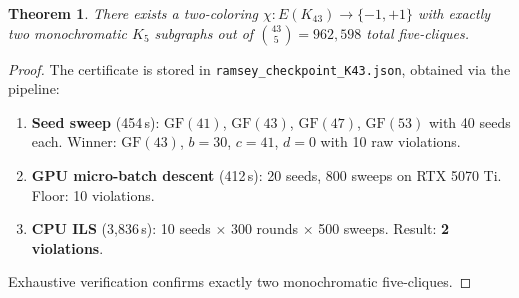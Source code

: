 \documentclass[11pt,a4paper]{article}
\theoremstyle{plain}
\newtheorem{theorem}{Theorem}[section]
\theoremstyle{remark}
\newcommand{\GF}{\mathrm{GF}}
\begin{document}
\begin{theorem}\label{thm:k43-frontier}
There exists a two-coloring $\chi: E(K_{43}) \to \{-1, +1\}$
with exactly two monochromatic $K_5$ subgraphs out of
$\binom{43}{5} = 962{,}598$ total five-cliques.
\end{theorem}

\begin{proof}
The certificate is stored in \texttt{ramsey\_checkpoint\_K43.json},
obtained via the pipeline:
\begin{enumerate}[leftmargin=2em]
  \item \textbf{Seed sweep} (454\,s): $\GF(41)$, $\GF(43)$,
    $\GF(47)$, $\GF(53)$ with 40 seeds each.
    Winner: $\GF(43)$, $b=30$, $c=41$, $d=0$ with 10 raw violations.
  \item \textbf{GPU micro-batch descent} (412\,s): 20 seeds,
    800 sweeps on RTX 5070 Ti. Floor: 10 violations.
  \item \textbf{CPU ILS} (3{,}836\,s): 10 seeds $\times$ 300 rounds
    $\times$ 500 sweeps. Result: \textbf{2 violations}.
\end{enumerate}
Exhaustive verification confirms exactly two monochromatic five-cliques.
\end{proof}
\end{document}
